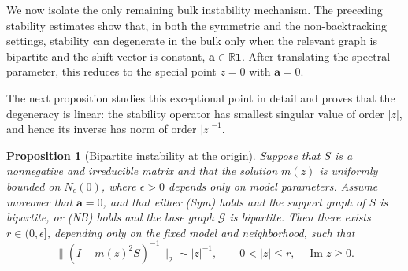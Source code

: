 \documentclass[11pt,twoside, a4paper]{article}
\numberwithin{equation}{section}
\numberwithin{figure}{section}
\theoremstyle{plain} %
\newtheorem{proposition}[theorem]{Proposition}
\theoremstyle{definition}
\theoremstyle{remark}
\newcommand{\1} {\mspace{1 mu}}
\newcommand{\2} {\mspace{2 mu}}
\begin{document}
We now isolate the only remaining bulk instability mechanism. 
The preceding stability estimates show that, in both the symmetric and the non-backtracking settings, stability can degenerate in the bulk only when the relevant graph is bipartite and the shift vector is constant, \(\mathbf a\in\mathbb R\mathbf 1\). After translating the spectral parameter, this reduces to the special point \(z=0\) with \(\mathbf a=0\). 

The next proposition studies this exceptional point in detail and proves that the degeneracy is linear: the stability operator has smallest singular value of order \(|z|\), and hence its inverse has norm of order \(|z|^{-1}\).

\begin{proposition}[Bipartite instability at the origin]\label{prop.bipartite-origin-instability}
    Suppose that $S$ is a nonnegative and irreducible matrix and that the solution $m(z)$ is uniformly bounded on $N_\epsilon(0)$, where $\epsilon>0$ depends only on model parameters. Assume moreover that $\mathbf{a}=0$, and that either \textup{(Sym)} holds and the support graph of $S$ is bipartite, or \textup{(NB)} holds and the base graph $\mathcal G$ is bipartite.
    Then there exists $r\in(0,\epsilon]$, depending only on the fixed model and neighborhood, such that
    \[
        \big\|(I-m(z)^2S)^{-1}\big\|_2\sim |z|^{-1},\qquad 0<|z|\le r,\quad \operatorname{Im}z\ge0.
    \]
\end{proposition}
\end{document}
